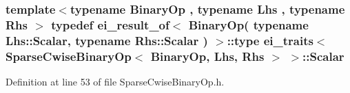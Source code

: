 \hypertarget{structei__traits_3_01_sparse_cwise_binary_op_3_01_binary_op_00_01_lhs_00_01_rhs_01_4_01_4_a9e78a9198a44524ecaa01235ce19ecc6}{
\subsubsection[{Scalar}]{\setlength{\rightskip}{0pt plus 5cm}template$<$typename Binary\-Op , typename Lhs , typename Rhs $>$ typedef {\bf ei\-\_\-result\-\_\-of}$<$ Binary\-Op( typename Lhs\-::\-Scalar, typename Rhs\-::\-Scalar ) $>$\-::{\bf type} {\bf ei\-\_\-traits}$<$ {\bf Sparse\-Cwise\-Binary\-Op}$<$ Binary\-Op, Lhs, Rhs $>$ $>$\-::{\bf Scalar}}}\label{structei__traits_3_01_sparse_cwise_binary_op_3_01_binary_op_00_01_lhs_00_01_rhs_01_4_01_4_a9e78a9198a44524ecaa01235ce19ecc6}


Definition at line 53 of file Sparse\-Cwise\-Binary\-Op.\-h.



